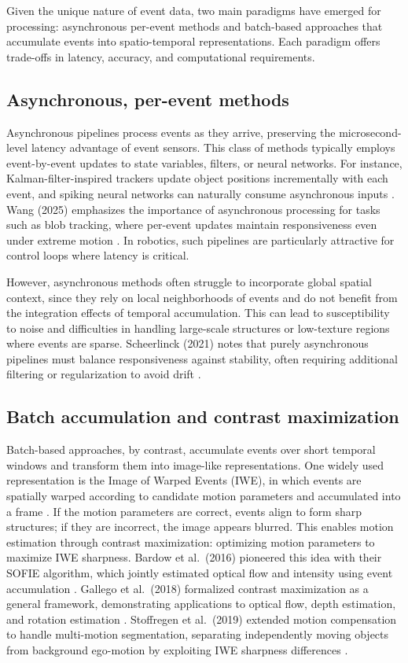 Given the unique nature of event data, two main paradigms have emerged for processing: asynchronous per-event methods and batch-based approaches that accumulate events into spatio-temporal representations. Each paradigm offers trade-offs in latency, accuracy, and computational requirements.

\subsection{Asynchronous, per-event methods}
Asynchronous pipelines process events as they arrive, preserving the microsecond-level latency advantage of event sensors. This class of methods typically employs event-by-event updates to state variables, filters, or neural networks. For instance, Kalman-filter-inspired trackers update object positions incrementally with each event, and spiking neural networks can naturally consume asynchronous inputs \cite{Maqueda2018}. Wang (2025) emphasizes the importance of asynchronous processing for tasks such as blob tracking, where per-event updates maintain responsiveness even under extreme motion \cite{Wang2025Thesis}. In robotics, such pipelines are particularly attractive for control loops where latency is critical.

However, asynchronous methods often struggle to incorporate global spatial context, since they rely on local neighborhoods of events and do not benefit from the integration effects of temporal accumulation. This can lead to susceptibility to noise and difficulties in handling large-scale structures or low-texture regions where events are sparse. Scheerlinck (2021) notes that purely asynchronous pipelines must balance responsiveness against stability, often requiring additional filtering or regularization to avoid drift \cite{Scheerlinck2021Thesis}.

\subsection{Batch accumulation and contrast maximization}
Batch-based approaches, by contrast, accumulate events over short temporal windows and transform them into image-like representations. One widely used representation is the Image of Warped Events (IWE), in which events are spatially warped according to candidate motion parameters and accumulated into a frame \cite{Gallego2018CMax}. If the motion parameters are correct, events align to form sharp structures; if they are incorrect, the image appears blurred. This enables motion estimation through contrast maximization: optimizing motion parameters to maximize IWE sharpness. Bardow et al.\ (2016) pioneered this idea with their SOFIE algorithm, which jointly estimated optical flow and intensity using event accumulation \cite{Bardow2016SOFIE}. Gallego et al.\ (2018) formalized contrast maximization as a general framework, demonstrating applications to optical flow, depth estimation, and rotation estimation \cite{Gallego2018CMax}. Stoffregen et al.\ (2019) extended motion compensation to handle multi-motion segmentation, separating independently moving objects from background ego-motion by exploiting IWE sharpness differences \cite{Stoffregen2019Segmentation}.

